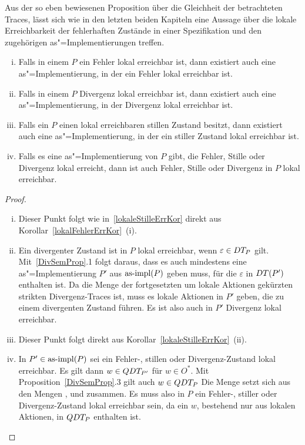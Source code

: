 Aus der so eben bewiesenen Proposition über die Gleichheit der betrachteten
Traces, lässt sich wie in den letzten beiden Kapiteln eine Aussage über die
lokale Erreichbarkeit der fehlerhaften Zustände in einer Spezifikation und den
zugehörigen as"=Implementierungen treffen.

\begin{Kor}\mbox{}
  \label{lokalDivErrKor}
  \begin{enumerate}[(i)]
    \item Falls in einem \MEIO{} $P$ ein Fehler lokal erreichbar ist, dann
      existiert auch eine as"=Implementierung, in der ein Fehler lokal
      erreichbar ist.
    \item Falls in einem \MEIO{} $P$ Divergenz lokal erreichbar ist, dann
      existiert auch eine as"=Implementierung, in der Divergenz lokal
      erreichbar ist.
    \item Falls ein \MEIO{} $P$ einen lokal erreichbaren stillen Zustand
      besitzt, dann existiert auch eine as"=Implementierung, in der ein stiller
      Zustand lokal erreichbar ist.
    \item Falls es eine as"=Implementierung von $P$ gibt, die Fehler, Stille
      oder Divergenz lokal erreicht, dann ist auch Fehler, Stille oder
      Divergenz in $P$ lokal erreichbar.
  \end{enumerate}
\end{Kor}
\begin{proof}\mbox{}
  \begin{enumerate}[(i)]
    \item Dieser Punkt folgt wie in~\ref{lokaleStilleErrKor} direkt aus
      Korollar~\ref{lokalFehlerErrKor}~(i).
    \item Ein divergenter Zustand ist in $P$ lokal erreichbar, wenn
      $\varepsilon \in DT _P$ gilt. Mit~\ref{DivSemProp}.1 folgt daraus, dass
      es auch mindestens eine as"=Implementierung $P'$ aus $\mathrm{as}\text{-}\mathrm{impl} (P)$ geben
      muss, für die $\varepsilon$ in $DT (P')$ enthalten ist. Da \DT{} die
      Menge der fortgesetzten um lokale Aktionen gekürzten strikten
      Divergenz-Traces ist, muss es lokale Aktionen in $P'$ geben, die zu einem
      divergenten Zustand führen. Es ist also auch in $P'$ Divergenz lokal
      erreichbar.
    \item Dieser Punkt folgt direkt aus Korollar~\ref{lokaleStilleErrKor}~(ii).
    \item In $P'\in\mathrm{as}\text{-}\mathrm{impl} (P)$ sei ein Fehler-, stillen oder Divergenz-Zustand
      lokal erreichbar. Es gilt dann $w\in QDT _{P'}$ für $w\in O^*$. Mit
      Proposition~\ref{DivSemProp}.3 gilt auch $w\in QDT _P$ Die Menge \QDT{}
      setzt sich aus den Mengen \ET{}, \StQT{} und \DT{} zusammen. Es muss also
      in $P$ ein Fehler-, stiller oder Divergenz-Zustand lokal erreichbar sein,
      da ein $w$, bestehend nur aus lokalen Aktionen, in $QDT _P$ enthalten
      ist.
  \end{enumerate}
\end{proof}

